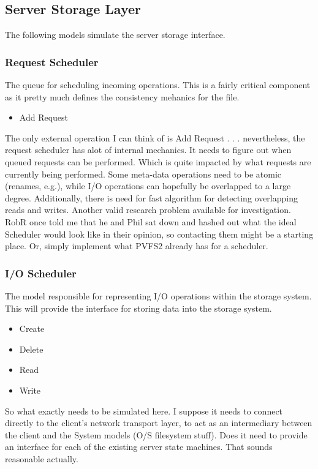 \documentclass[11pt]{article}
\begin{document}
\subsection{Server Storage Layer}
The following models simulate the server storage interface.

\subsubsection{Request Scheduler}
The queue for scheduling incoming operations.  This is a fairly critical
component as it pretty much defines the consistency mehanics for the file.

\begin{itemize}
\item Add Request
\end{itemize}

The only external operation I can think of is Add Request . . . nevertheless,
the request scheduler has alot of internal mechanics.  It needs to figure out
when queued requests can be performed.  Which is quite impacted by what
requests are currently being performed.  Some meta-data operations need to be
atomic (renames, e.g.), while I/O operations can hopefully be overlapped to a
large degree.  Additionally, there is need for fast algorithm for detecting
overlapping reads and writes.  Another valid research problem available for
investigation.  RobR once told me that he and Phil sat down and hashed out
what the ideal Scheduler would look like in their opinion, so contacting them
might be a starting place.  Or, simply implement what PVFS2 already has for a
scheduler.

\subsubsection{I/O Scheduler}
The model responsible for representing I/O operations within the storage
system.  This will provide the interface for storing data into the storage
system.

\begin{itemize}
\item Create
\item Delete
\item Read
\item Write
\end{itemize}

So what exactly needs to be simulated here.  I suppose it needs to connect
directly to the client's network transport layer, to act as an intermediary
between the client and the System models (O/S filesystem stuff).  Does it need
to provide an interface for each of the existing server state machines.  That
sounds reasonable actually.
\end{document}
